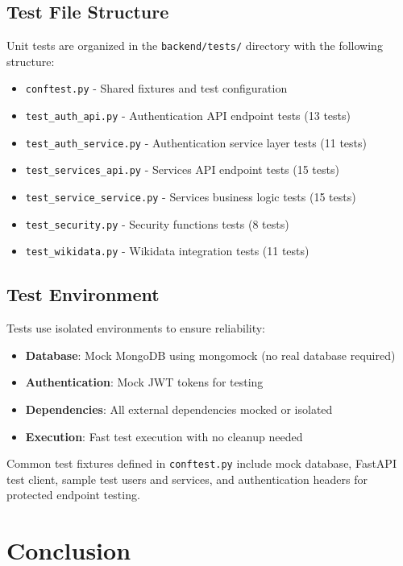 \documentclass[12pt,a4paper]{report}
\begin{document}
\subsection{Test File Structure}

Unit tests are organized in the \texttt{backend/tests/} directory with the following structure:

\begin{itemize}
    \item \texttt{conftest.py} - Shared fixtures and test configuration
    \item \texttt{test\_auth\_api.py} - Authentication API endpoint tests (13 tests)
    \item \texttt{test\_auth\_service.py} - Authentication service layer tests (11 tests)
    \item \texttt{test\_services\_api.py} - Services API endpoint tests (15 tests)
    \item \texttt{test\_service\_service.py} - Services business logic tests (15 tests)
    \item \texttt{test\_security.py} - Security functions tests (8 tests)
    \item \texttt{test\_wikidata.py} - Wikidata integration tests (11 tests)
\end{itemize}

\subsection{Test Environment}

Tests use isolated environments to ensure reliability:
\begin{itemize}
    \item \textbf{Database}: Mock MongoDB using mongomock (no real database required)
    \item \textbf{Authentication}: Mock JWT tokens for testing
    \item \textbf{Dependencies}: All external dependencies mocked or isolated
    \item \textbf{Execution}: Fast test execution with no cleanup needed
\end{itemize}

Common test fixtures defined in \texttt{conftest.py} include mock database, FastAPI test client, sample test users and services, and authentication headers for protected endpoint testing.

\section{Conclusion}
\end{document}
